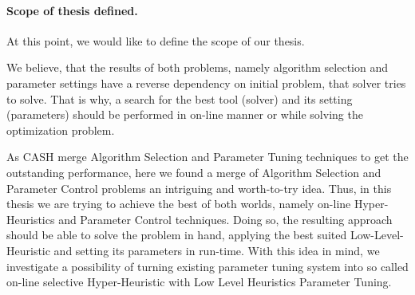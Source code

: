 \paragraph{Scope of thesis defined.}
At this point, we would like to define the scope of our thesis.

We believe, that the results of both problems, namely algorithm selection and parameter settings have a reverse dependency on initial problem, that solver tries to solve.
That is why, a search for the best tool (solver) and its setting (parameters) should be performed in on-line manner or while solving the optimization problem.

As CASH merge Algorithm Selection and Parameter Tuning techniques to get the outstanding performance, here we found a merge of Algorithm Selection and Parameter Control problems an intriguing and worth-to-try idea. 
Thus, in this thesis we are trying to achieve the best of both worlds, namely on-line Hyper-Heuristics and Parameter Control techniques. Doing so, the resulting approach should be able to solve the problem in hand, applying the best suited Low-Level-Heuristic and setting its parameters in run-time. With this idea in mind, we investigate a possibility of turning existing parameter tuning system into so called on-line selective Hyper-Heuristic with Low Level Heuristics Parameter Tuning.
